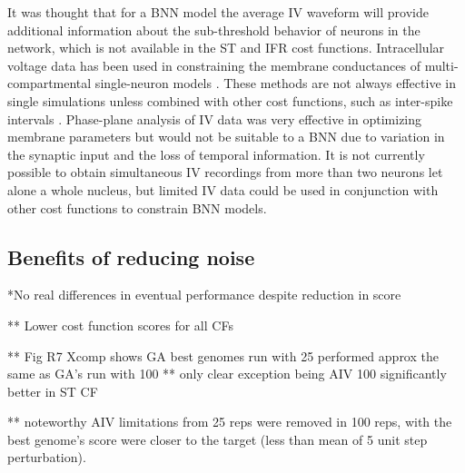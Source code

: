 \medskip{}

It was thought that for a BNN model the average IV waveform will provide
additional information about the sub-threshold behavior of neurons in the
network, which is not available in the ST and IFR cost functions.  Intracellular
voltage data has been used in constraining the membrane conductances of
multi-compartmental single-neuron models \cite{Le_Masson:2000,KerenPeledEtAl:2005}.
These methods are not always effective in single simulations unless combined
with other cost functions, such as inter-spike intervals
\citep{KerenPeledEtAl:2005}. Phase-plane analysis of IV data was very effective
in optimizing membrane parameters \citep{VanDeEtAl:2008,KerenPeledEtAl:2005} but would not
be suitable to a BNN due to variation in the synaptic input and the loss of
temporal information.  It is not currently possible to obtain simultaneous IV
recordings from more than two neurons let alone a whole nucleus, but limited IV
data could be used in conjunction with other cost functions to constrain BNN
models.

\subsection{Benefits of reducing noise}\label{sec:GA:benef-reduc-noise}

\medskip{} 

*No real differences in eventual performance
  despite reduction in score

** Lower cost function scores for all CFs

** Fig R7 Xcomp shows GA best genomes run with 25
    performed approx the same as GA's run with 100
** only clear exception being AIV 100 significantly better in ST CF

** noteworthy AIV limitations from 25 reps were removed
  in 100 reps, with the best genome's score were closer to the target
  (less than mean of 5 unit step perturbation).

\medskip{}

